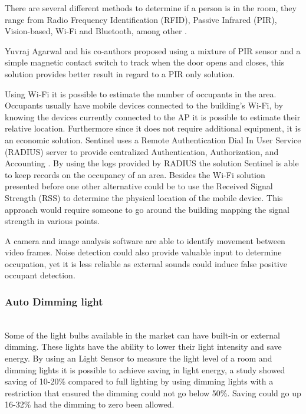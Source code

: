 There are several different methods to determine if a person is in the room, they range from Radio Frequency Identification (RFID), Passive Infrared (PIR), Vision-based, Wi-Fi and Bluetooth, among other \cite{ocupancy3}.

Yuvraj Agarwal and his co-authors proposed using a mixture of PIR sensor and a simple magnetic contact switch to track when the door opens and closes, this solution provides better result in regard to a PIR only solution\cite{ocupancy1}.

Using Wi-Fi it is possible to estimate the number of occupants in the area. Occupants usually have mobile devices connected to the building's Wi-Fi, by knowing the devices currently connected to the AP it is possible to estimate their relative location. Furthermore since it does not require additional equipment, it is an economic solution.
Sentinel uses a Remote Authentication Dial In User Service (RADIUS) server to provide centralized Authentication, Authorization, and Accounting \cite{wifi_ocupancy}. By using the logs provided by RADIUS the solution Sentinel is able to keep records on the occupancy of an area. 
Besides the Wi-Fi solution presented before one other alternative could be to use the Received Signal Strength (RSS) to determine the physical location of the mobile device\cite{wifi_ocupancy2}. This approach would require someone to go around the building mapping the signal strength in various points.

A camera and image analysis software are able to identify movement between video frames. Noise detection could also provide valuable input to determine occupation, yet it is less reliable as external sounds could induce false positive occupant detection.

\subsubsection{Auto Dimming light}\mbox{}\\

Some of the light bulbs available in the market can have built-in or external dimming. These lights have the ability to lower their light intensity and save energy.
By using an Light Sensor to measure the light level of a room and dimming lights it is possible to achieve saving in light energy, a study \cite{sensor_app_lights} showed saving of 10-20\% compared to full lighting by using dimming lights with a restriction that ensured the dimming could not go below 50\%. Saving could go up 16-32\% had the dimming to zero been allowed.


